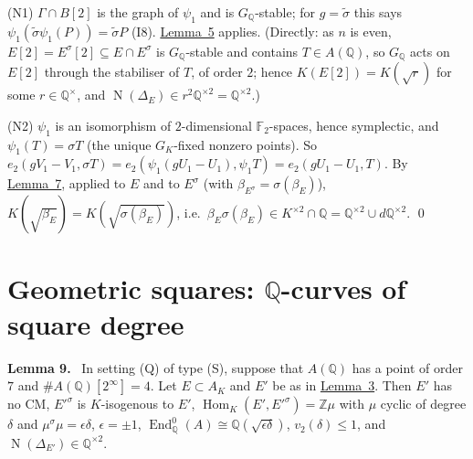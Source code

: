 \documentclass[11pt]{article}
\newenvironment{statement}[1]{\par\medskip\noindent\phantomsection\textbf{#1}\ }{\par\medskip}
\newcommand{\Q}{\mathbb Q}
\newcommand{\Z}{\mathbb Z}
\newcommand{\F}{\mathbb F}
\DeclareMathOperator{\End}{End}
\DeclareMathOperator{\Hom}{Hom}
\DeclareMathOperator{\Norm}{N}
\begin{document}
(N1) \(\Gamma\cap B[2]\) is the graph of \(\psi_1\) and is \(G_{\Q}\)-stable; for \(g=\tilde\sigma\) this says
\(\psi_1(\tilde\sigma\psi_1(P))=\tilde\sigma P\) (I8). \hyperref[lemma-descent]{Lemma~5} applies. (Directly: as \(n\) is even,
\(E[2]=E^\sigma[2]\subseteq E\cap E^\sigma\) is \(G_{\Q}\)-stable and contains \(T\in A(\Q)\), so \(G_{\Q}\) acts on
\(E[2]\) through the stabiliser of \(T\), of order \(2\); hence \(K(E[2])=K(\sqrt r)\) for some \(r\in\Q^\times\), and
\(\Norm(\Delta_E)\in r^2\Q^{\times2}=\Q^{\times2}\).)

(N2) \(\psi_1\) is an isomorphism of \(2\)-dimensional \(\F_2\)-spaces, hence symplectic, and \(\psi_1(T)=\sigma T\)
(the unique \(G_K\)-fixed nonzero points). So \(e_2(gV_1-V_1,\sigma T)=e_2(\psi_1(gU_1-U_1),\psi_1T)=e_2(gU_1-U_1,T)\).
By \hyperref[lemma-char]{Lemma~7}, applied to \(E\) and to \(E^\sigma\) (with \(\beta_{E^\sigma}=\sigma(\beta_E)\)),
\(K(\sqrt{\beta_E})=K(\sqrt{\sigma(\beta_E)})\), i.e.~\(\beta_E\sigma(\beta_E)\in K^{\times2}\cap\Q=\Q^{\times2}\cup
d\Q^{\times2}\). \qed

\section{Geometric squares: \(\Q\)-curves of square degree}\label{qcurves}

\begin{statement}{Lemma 9.}\label{lemma-qcurve}
In setting (Q) of type (S), suppose that \(A(\Q)\) has a point of order \(7\) and \(\#A(\Q)[2^\infty]=4\). Let
\(E\subset A_K\) and \(E'\) be as in \hyperref[lemma-x114]{Lemma~3}. Then \(E'\) has no CM, \(E'^\sigma\) is
\(K\)-isogenous to \(E'\), \(\Hom_K(E',E'^\sigma)=\Z\mu\) with \(\mu\) cyclic of degree \(\delta\) and
\(\mu^\sigma\mu=\epsilon\delta\), \(\epsilon=\pm1\), \(\End^0_{\Q}(A)\cong\Q(\sqrt{\epsilon\delta})\),
\(v_2(\delta)\le1\), and \(\Norm(\Delta_{E'})\in\Q^{\times2}\).
\end{statement}
\end{document}
